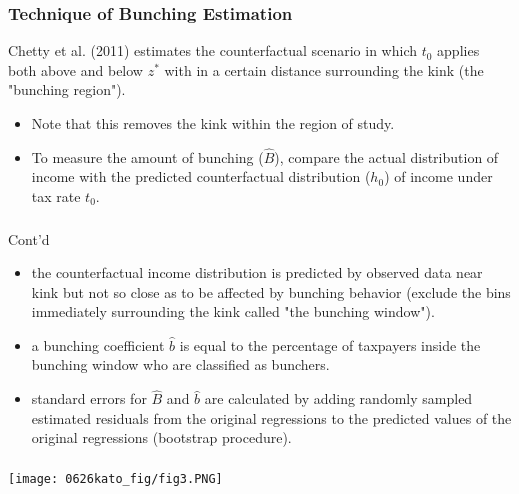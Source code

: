 \documentclass[unicode,12pt]{beamer}
\begin{document}
    \begin{frame}
        \frametitle{Technique of Bunching Estimation}
    
        Chetty et al. (2011) estimates the counterfactual scenario in which $t_0$ applies both above and below $z^*$ with in a certain distance surrounding the kink (the "bunching region").
        \begin{itemize}
            \item Note that this removes the kink within the region of study.
            \item To measure the amount of bunching ($\hat{B}$), compare the actual distribution of income with the predicted counterfactual distribution ($h_0$) of income under tax rate $t_0$.
        \end{itemize}
    
    \end{frame}

    \begin{frame}
        \frametitle{}
    
        Cont'd
        \begin{itemize}
            \item the counterfactual income distribution is predicted by observed data near kink but not so close as to be affected by bunching behavior (exclude the bins immediately surrounding the kink called "the bunching window").
            \item a bunching coefficient $\hat{b}$ is equal to the percentage of taxpayers inside the bunching window who are classified as bunchers. 
            \item standard errors for $\hat{B}$ and $\hat{b}$ are calculated by adding randomly sampled estimated residuals from the original regressions to the predicted values of the original regressions (bootstrap procedure).
        \end{itemize}
    
    \end{frame}

    \begin{frame}
        \frametitle{}
    
        \centerline{\texttt{[image: 0626kato\_fig/fig3.PNG]}}
    
    \end{frame}
\end{document}
